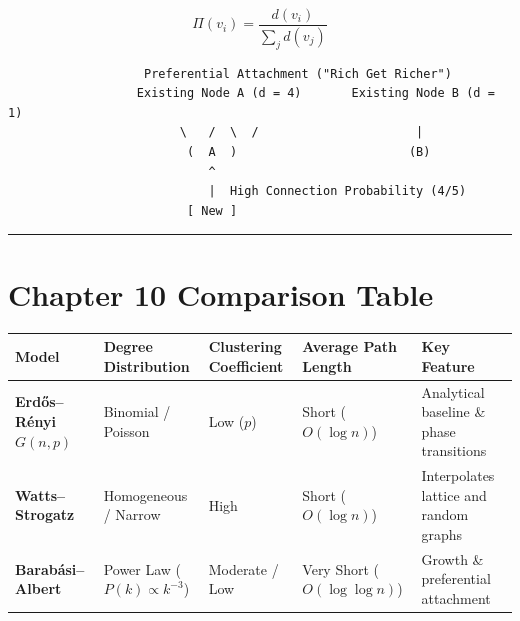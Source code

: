 \documentclass[
]{book}
\newcounter{none} %
\theoremstyle{definition}
\theoremstyle{definition}
\theoremstyle{definition}
\theoremstyle{definition}
\theoremstyle{remark}
\begin{document}
\[\Pi(v_i) = \frac{d(v_i)}{\sum_{j} d(v_j)}\]

\begin{verbatim}
                   Preferential Attachment ("Rich Get Richer")
                  Existing Node A (d = 4)       Existing Node B (d = 1)
                        \   /  \  /                      |
                         (  A  )                        (B)
                            ^
                            |  High Connection Probability (4/5)
                         [ New ]
\end{verbatim}

\begin{center}\rule{0.5\linewidth}{0.5pt}\end{center}

\section{Chapter 10 Comparison Table}\label{chapter-10-comparison-table}

{\def\LTcaptype{none} %
\begin{longtable}[]{@{}
  >{\raggedright\arraybackslash}p{}
  >{\raggedright\arraybackslash}p{}
  >{\raggedright\arraybackslash}p{}
  >{\raggedright\arraybackslash}p{}
  >{\raggedright\arraybackslash}p{}@{}}
\toprule\noalign{}
\begin{minipage}[b]{\linewidth}\raggedright
Model
\end{minipage} & \begin{minipage}[b]{\linewidth}\raggedright
Degree Distribution
\end{minipage} & \begin{minipage}[b]{\linewidth}\raggedright
Clustering Coefficient
\end{minipage} & \begin{minipage}[b]{\linewidth}\raggedright
Average Path Length
\end{minipage} & \begin{minipage}[b]{\linewidth}\raggedright
Key Feature
\end{minipage} \\
\midrule\noalign{}
\endhead
\bottomrule\noalign{}
\endlastfoot
\textbf{Erdős--Rényi \(G(n, p)\)} & Binomial / Poisson & Low (\(p\)) & Short (\(O(\log n)\)) & Analytical baseline \& phase transitions \\
\textbf{Watts--Strogatz} & Homogeneous / Narrow & High & Short (\(O(\log n)\)) & Interpolates lattice and random graphs \\
\textbf{Barabási--Albert} & Power Law (\(P(k) \propto k^{-3}\)) & Moderate / Low & Very Short (\(O(\log \log n)\)) & Growth \& preferential attachment \\
\end{longtable}
}
\end{document}
